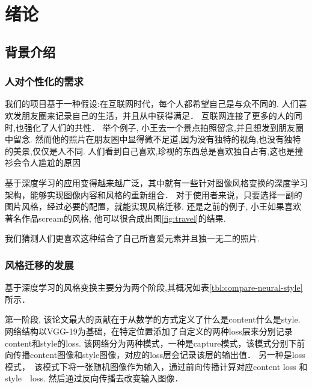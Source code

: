 
\section{绪论}
\subsection{背景介绍}\label{section:background}

\subsubsection{人对个性化的需求}
我们的项目基于一种假设:在互联网时代，每个人都希望自己是与众不同的.
人们喜欢发朋友圈来记录自己的生活，并且从中获得满足．
互联网连接了更多的人的同时,也强化了人们的共性．
举个例子, 小王去一个景点拍照留念,并且想发到朋友圈中留念.
然而他的照片在朋友圈中显得微不足道,因为没有独特的视角,也没有独特的美景,仅仅是人不同.
人们看到自己喜欢,珍视的东西总是喜欢独自占有,这也是撞衫会令人尴尬的原因

基于深度学习的应用变得越来越广泛，其中就有一些针对图像风格变换的深度学习架构，能够实现图像内容和风格的重新组合．
对于使用者来说，只要选择一副的图片风格，经过必要的配置，就能实现风格迁移.
还是之前的例子, 小王如果喜欢著名作品scream的风格, 他可以很合成出图\ref{fig:travel}的结果.

我们猜测人们更喜欢这种结合了自己所喜爱元素并且独一无二的照片.

\subsubsection{风格迁移的发展}\label{section:neural-style}
基于深度学习的风格变换主要分为两个阶段,其概况如表\ref{tbl:compare-neural-style}所示．

第一阶段, 该论文最大的贡献在于从数学的方式定义了什么是content什么是style.
网络结构以VGG-19为基础，在特定位置添加了自定义的两种loss层来分别记录content和style的loss.
该网络分为两种模式，一种是capture模式，该模式分别下前向传播content图像和style图像，对应的loss层会记录该层的输出值．
另一种是loss模式，　该模式下将一张随机图像作为输入，通过前向传播计算对应content loss 和style　loss. 
然后通过反向传播去改变输入图像．

